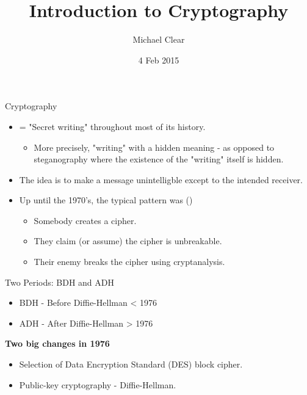 \documentclass[presentation]{beamer}
\author{Michael Clear}
\date{4 Feb 2015}
\title{Introduction to Cryptography}
\begin{document}
\maketitle
\newcommand{\fname}{\mathsf}
\begin{frame}[label=sec-1]{Cryptography}
\begin{itemize}
\item = "Secret writing" throughout most of its history.
\begin{itemize}
\item More precisely, "writing" with a hidden meaning - as opposed to steganography where the existence of the "writing" itself is hidden.
\end{itemize}
\item The idea is to make a message unintelligble except to the intended receiver.
\end{itemize}

\vspace{20pt}
\begin{itemize}
\item Up until the 1970's, the typical pattern was (\cite{cos433})
\begin{itemize}
\item Somebody creates a cipher.
\item They claim (or assume) the cipher is unbreakable.
\item Their enemy breaks the cipher using cryptanalysis.
\end{itemize}
\end{itemize}
\end{frame}
\begin{frame}[label=sec-2]{Two Periods: BDH and ADH}
\begin{itemize}
\item BDH - Before Diffie-Hellman < 1976
\item ADH - After Diffie-Hellman > 1976
\end{itemize}

\vspace{20pt}
\textbf{Two big changes in 1976}
\begin{itemize}
\item Selection of Data Encryption Standard (DES) block cipher.
\item Public-key cryptography - Diffie-Hellman.
\end{itemize}
\end{frame}
\end{document}
